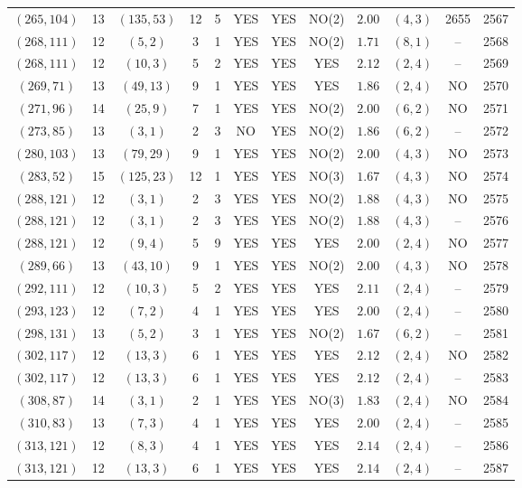 \begin{longtable}{|c|c|c|c|c|c|c|c|c|c|c|c|}
$(265,104)$ & 13 & $(135,53)$ & 12 & 5 & YES & YES & NO(2) & $2.00$ & $(4,3)$ & 2655 & 2567\\
$(268,111)$ & 12 & $(5,2)$ & 3 & 1 & YES & YES & NO(2) & $1.71$ & $(8,1)$ & -- & 2568\\
$(268,111)$ & 12 & $(10,3)$ & 5 & 2 & YES & YES & YES & $2.12$ & $(2,4)$ & -- & 2569\\
$(269,71)$ & 13 & $(49,13)$ & 9 & 1 & YES & YES & YES & $1.86$ & $(2,4)$ & NO & 2570\\
$(271,96)$ & 14 & $(25,9)$ & 7 & 1 & YES & YES & NO(2) & $2.00$ & $(6,2)$ & NO & 2571\\
$(273,85)$ & 13 & $(3,1)$ & 2 & 3 & NO & YES & NO(2) & $1.86$ & $(6,2)$ & -- & 2572\\
$(280,103)$ & 13 & $(79,29)$ & 9 & 1 & YES & YES & NO(2) & $2.00$ & $(4,3)$ & NO & 2573\\
$(283,52)$ & 15 & $(125,23)$ & 12 & 1 & YES & YES & NO(3) & $1.67$ & $(4,3)$ & NO & 2574\\
$(288,121)$ & 12 & $(3,1)$ & 2 & 3 & YES & YES & NO(2) & $1.88$ & $(4,3)$ & NO & 2575\\
$(288,121)$ & 12 & $(3,1)$ & 2 & 3 & YES & YES & NO(2) & $1.88$ & $(4,3)$ & -- & 2576\\
$(288,121)$ & 12 & $(9,4)$ & 5 & 9 & YES & YES & YES & $2.00$ & $(2,4)$ & NO & 2577\\
$(289,66)$ & 13 & $(43,10)$ & 9 & 1 & YES & YES & NO(2) & $2.00$ & $(4,3)$ & NO & 2578\\
$(292,111)$ & 12 & $(10,3)$ & 5 & 2 & YES & YES & YES & $2.11$ & $(2,4)$ & -- & 2579\\
$(293,123)$ & 12 & $(7,2)$ & 4 & 1 & YES & YES & YES & $2.00$ & $(2,4)$ & -- & 2580\\
$(298,131)$ & 13 & $(5,2)$ & 3 & 1 & YES & YES & NO(2) & $1.67$ & $(6,2)$ & -- & 2581\\
$(302,117)$ & 12 & $(13,3)$ & 6 & 1 & YES & YES & YES & $2.12$ & $(2,4)$ & NO & 2582\\
$(302,117)$ & 12 & $(13,3)$ & 6 & 1 & YES & YES & YES & $2.12$ & $(2,4)$ & -- & 2583\\
$(308,87)$ & 14 & $(3,1)$ & 2 & 1 & YES & YES & NO(3) & $1.83$ & $(2,4)$ & NO & 2584\\
$(310,83)$ & 13 & $(7,3)$ & 4 & 1 & YES & YES & YES & $2.00$ & $(2,4)$ & -- & 2585\\
$(313,121)$ & 12 & $(8,3)$ & 4 & 1 & YES & YES & YES & $2.14$ & $(2,4)$ & -- & 2586\\
$(313,121)$ & 12 & $(13,3)$ & 6 & 1 & YES & YES & YES & $2.14$ & $(2,4)$ & -- & 2587\\

\end{longtable}
